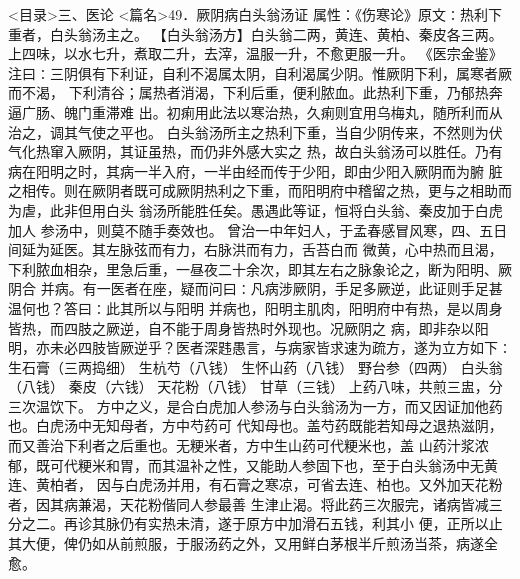 \documentclass[a4paper,12pt,UTF8,twoside]{ctexbook}
\begin{document}
<目录>三、医论
<篇名>49．厥阴病白头翁汤证
属性：《伤寒论》原文∶热利下重者，白头翁汤主之。 
【白头翁汤方】白头翁二两，黄连、黄柏、秦皮各三两。 
上四味，以水七升，煮取二升，去滓，温服一升，不愈更服一升。 
《医宗金鉴》注曰∶三阴俱有下利证，自利不渴属太阴，自利渴属少阴。惟厥阴下利，属寒者厥而不渴， 
下利清谷；属热者消渴，下利后重，便利脓血。此热利下重，乃郁热奔逼广肠、魄门重滞难 
出。初痢用此法以寒治热，久痢则宜用乌梅丸，随所利而从治之，调其气使之平也。 
白头翁汤所主之热利下重，当自少阴传来，不然则为伏气化热窜入厥阴，其证虽热，而仍非外感大实之 
热，故白头翁汤可以胜任。乃有病在阳明之时，其病一半入府，一半由经而传于少阳，即由少阳入厥阴而为腑 
脏之相传。则在厥阴者既可成厥阴热利之下重，而阳明府中稽留之热，更与之相助而为虐，此非但用白头 
翁汤所能胜任矣。愚遇此等证，恒将白头翁、秦皮加于白虎加人 
参汤中，则莫不随手奏效也。 
曾治一中年妇人，于孟春感冒风寒，四、五日间延为延医。其左脉弦而有力，右脉洪而有力，舌苔白而 
微黄，心中热而且渴，下利脓血相杂，里急后重，一昼夜二十余次，即其左右之脉象论之，断为阳明、厥阴合 
并病。有一医者在座，疑而问曰∶凡病涉厥阴，手足多厥逆，此证则手足甚温何也？答曰∶此其所以与阳明 
并病也，阳明主肌肉，阳明府中有热，是以周身皆热，而四肢之厥逆，自不能于周身皆热时外现也。况厥阴之 
病，即非杂以阳明，亦未必四肢皆厥逆乎？医者深韪愚言，与病家皆求速为疏方，遂为立方如下∶ 
生石膏（三两捣细） 生杭芍（八钱） 生怀山药（八钱） 野台参（四两） 
白头翁（八钱） 秦皮（六钱） 天花粉（八钱） 甘草（三钱） 
上药八味，共煎三盅，分三次温饮下。 
方中之义，是合白虎加人参汤与白头翁汤为一方，而又因证加他药也。白虎汤中无知母者，方中芍药可 
代知母也。盖芍药既能若知母之退热滋阴，而又善治下利者之后重也。无粳米者，方中生山药可代粳米也，盖 
山药汁浆浓郁，既可代粳米和胃，而其温补之性，又能助人参固下也，至于白头翁汤中无黄连、黄柏者， 
因与白虎汤并用，有石膏之寒凉，可省去连、柏也。又外加天花粉者，因其病兼渴，天花粉偕同人参最善 
生津止渴。将此药三次服完，诸病皆减三分之二。再诊其脉仍有实热未清，遂于原方中加滑石五钱，利其小 
便，正所以止其大便，俾仍如从前煎服，于服汤药之外，又用鲜白茅根半斤煎汤当茶，病遂全愈。 
\end{document}
